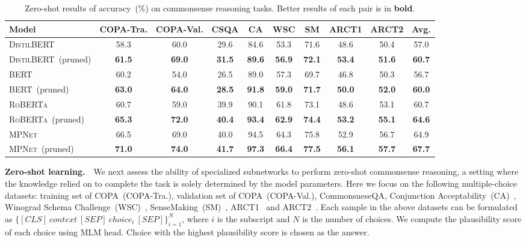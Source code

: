 \begin{table}[t!]
	\centering
	\scriptsize
	\begin{tabular}{l|cccccccc|c}
		\toprule
		\textbf{Model} &COPA-Tra. &COPA-Val. &CSQA &CA &WSC  &SM &ARCT1 &ARCT2 &Avg. \\
		\midrule
		\textsc{DistilBERT} &58.3 &60.0 &29.6 &84.6 &53.3  &71.6 &48.6 &50.4  &57.0  \\
		\textsc{DistilBERT}~(pruned) &\textbf{61.5} &\textbf{69.0} &\textbf{31.5} &\textbf{89.6} &\textbf{56.9}  &\textbf{72.1} &\textbf{53.4} &\textbf{51.6} & \textbf{60.7} \\
		\midrule
		\textsc{BERT} &60.2 &54.0 &26.5 &89.0 &57.3  &69.7 &46.8 &50.3 &56.7 \\
		\textsc{BERT}~(pruned) &\textbf{63.0} &\textbf{64.0} &\textbf{28.5} &\textbf{91.8} &\textbf{59.0}  &\textbf{71.7} &\textbf{50.0} &\textbf{52.0}  & \textbf{60.0}\\
		\midrule
		\textsc{RoBERTa} &60.7 &59.0 &39.9 &90.1 &61.8  &73.1 &48.6 &53.1 &60.7 \\
		\textsc{RoBERTa}~(pruned) &\textbf{65.3} &\textbf{72.0} &\textbf{40.4} &\textbf{93.4} &\textbf{62.9}  &\textbf{74.4} &\textbf{53.2} &\textbf{55.1} &\textbf{64.6}\\
		\midrule
		\textsc{MPNet} &66.5 &69.0 &40.0 &94.5 &64.3&75.8  &52.9 &56.7 &64.9  \\
		\textsc{MPNet}~(pruned) &\textbf{71.0} &\textbf{74.0} &\textbf{41.7} &\textbf{97.3} &\textbf{66.4}  &\textbf{77.5} &\textbf{56.1} &\textbf{57.7}  & \textbf{67.7}\\
		\bottomrule
	\end{tabular}
	\caption{Zero-shot results of accuracy~(\%) on commonsense reasoning tasks. Better results of each pair is in \textbf{bold}.}
	\label{table:zeroshot}
\end{table}



\textbf{Zero-shot learning.}~~We next assess the ability of specialized 
subnetworks to perform zero-shot commonsense reasoning, a setting where 
the knowledge relied on to complete the task is solely determined by the model 
parameters. Here we focus on the following multiple-choice datasets: training set of COPA~(COPA-Tra.), validation set of COPA~(COPA-Val.), CommonsneseQA, Conjunction 
Acceptability~(CA)~\citep{Zhou2019}, 
Winograd Schema Challenge~(WSC)~\citep{levesque_winograd_2012}, 
SenseMaking~(SM)~\citep{wang-etal-2019-make}, 
ARCT1~\citep{habernal-etal-2018-argument} and 
ARCT2~\citep{DBLP:journals/corr/abs-1907-07355}. Each sample in the above datasets can be formulated as $\{[CLS]~context~[SEP]~choice_i ~[SEP]\}_{i=1}^{N}$, where $i$ is the subscript and $N$ is the number of choices. We compute the plausibility score of each choice using MLM head. Choice with the highest plausibility score is chosen as the answer. 

